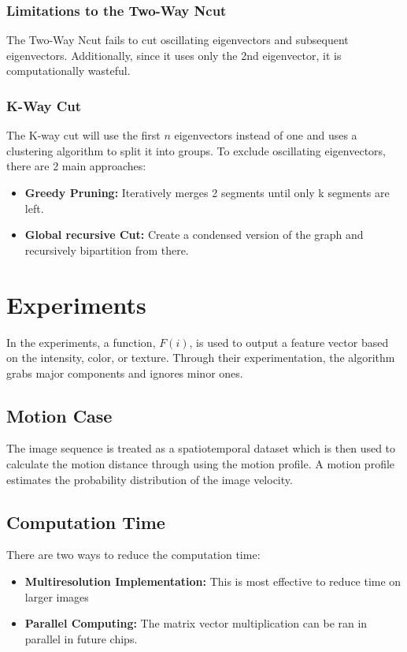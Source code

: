 \documentclass[letterpaper, 10 pt, conference]{ieeeconf}  %
\begin{document}
\subsubsection{Limitations to the Two-Way Ncut}
The Two-Way Ncut fails to cut oscillating eigenvectors and subsequent eigenvectors. Additionally, since it uses only the 2nd eigenvector, it is computationally wasteful.
\smallbreak
\subsubsection{K-Way Cut}
The K-way cut will use the first $n$ eigenvectors instead of one and uses a clustering algorithm to split it into groups. To exclude oscillating eigenvectors, there are 2 main approaches: 
\begin{itemize}
\item \textbf{Greedy Pruning:} Iteratively merges 2 segments until only k segments are left.
\item \textbf{Global recursive Cut:} Create a condensed version of the graph and recursively bipartition from there.
\end{itemize}
\section{Experiments}
In the experiments, a function, $F(i)$, is used to output a feature vector based on the intensity, color, or texture. Through their experimentation, the algorithm grabs major components and ignores minor ones.
\subsection{Motion Case}
The image sequence is treated as a spatiotemporal dataset which is then used to calculate the motion distance through using the motion profile. A motion profile estimates the  probability distribution of the image velocity.
\subsection{Computation Time}
There are two ways to reduce the computation time: 
\begin{itemize}
\item \textbf{Multiresolution Implementation:} This is most effective to reduce time on larger images
\item \textbf{Parallel Computing:} The matrix vector multiplication can be ran in parallel in future chips.
\end{itemize}
\end{document}
